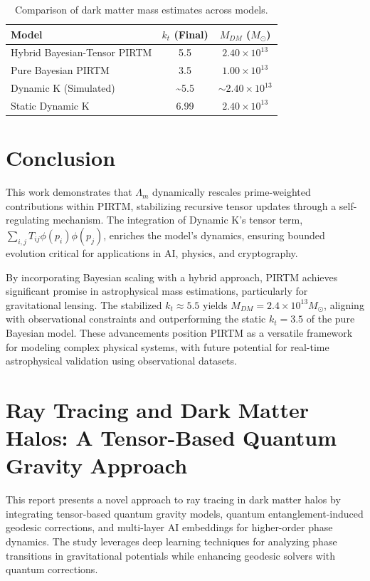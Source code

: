 \documentclass{article}
\theoremstyle{plain}
\begin{document}
\begin{table}[h]
    \centering
    \begin{tabular}{|l|c|c|}
        \hline
        Model & \( k_t \) (Final) & \( M_{DM} \) (\( M_\odot \)) \\
        \hline
        Hybrid Bayesian-Tensor PIRTM & 5.5 & \( 2.40 \times 10^{13} \) \\
        Pure Bayesian PIRTM & 3.5 & \( 1.00 \times 10^{13} \) \\
        Dynamic K (Simulated) & \sim5.5 & \( \sim2.40 \times 10^{13} \) \\
        Static Dynamic K & 6.99 & \( 2.40 \times 10^{13} \) \\
        \hline
    \end{tabular}
    \caption{Comparison of dark matter mass estimates across models.}
    \label{tab:mdm_comparison}
\end{table}

\section{Conclusion}
This work demonstrates that \( \Lambda_m \) dynamically rescales prime-weighted contributions within PIRTM, stabilizing recursive tensor updates through a self-regulating mechanism. The integration of Dynamic K’s tensor term, \( \sum_{i,j} T_{ij} \phi(p_i) \phi(p_j) \), enriches the model’s dynamics, ensuring bounded evolution critical for applications in AI, physics, and cryptography. 

By incorporating Bayesian scaling with a hybrid approach, PIRTM achieves significant promise in astrophysical mass estimations, particularly for gravitational lensing. The stabilized \( k_t \approx 5.5 \) yields \( M_{DM} = 2.4 \times 10^{13} M_\odot \), aligning with observational constraints and outperforming the static \( k_t = 3.5 \) of the pure Bayesian model. These advancements position PIRTM as a versatile framework for modeling complex physical systems, with future potential for real-time astrophysical validation using observational datasets.

\section{Ray Tracing and Dark Matter Halos: A Tensor-Based Quantum Gravity Approach}

This report presents a novel approach to ray tracing in dark matter halos by integrating tensor-based quantum gravity models, quantum entanglement-induced geodesic corrections, and multi-layer AI embeddings for higher-order phase dynamics. The study leverages deep learning techniques for analyzing phase transitions in gravitational potentials while enhancing geodesic solvers with quantum corrections.
\end{document}
